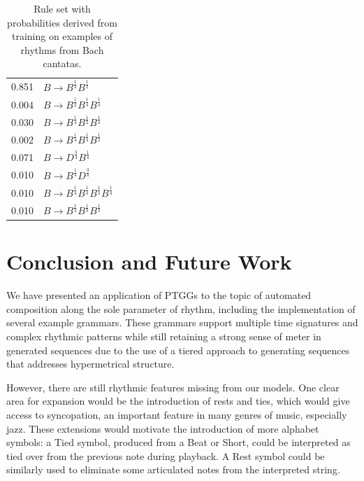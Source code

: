 \documentclass{article}
\begin{document}
\begin{table}
\centering
\begin{tabular}{ll}
0.851 & $B \rightarrow B^\frac{1}{2} B^\frac{1}{2}$\\
0.004 & $B \rightarrow B^\frac{1}{2} B^\frac{1}{4} B^\frac{1}{4}$\\
0.030 & $B \rightarrow B^\frac{1}{4} B^\frac{1}{2} B^\frac{1}{4}$\\ 
0.002 & $B \rightarrow B^\frac{1}{4} B^\frac{1}{4} B^\frac{1}{2}$\\ 
0.071 & $B \rightarrow D^\frac{3}{4} B^\frac{1}{4}$\\
0.010 & $B \rightarrow B^\frac{1}{4} D^\frac{3}{4}$\\
0.010 & $B \rightarrow B^\frac{1}{4} B^\frac{1}{4} B^\frac{1}{4} B^\frac{1}{4}$\\
0.010 & $B \rightarrow B^\frac{1}{3} B^\frac{1}{3} B^\frac{1}{3}$\\ 
\end{tabular}
\caption{Rule set with probabilities derived from training on examples of rhythms from Bach cantatas.}\label{simplerules}
\end{table}



\section{Conclusion and Future Work} 

We have presented an application of PTGGs to the topic of automated composition along the sole parameter of rhythm, including the implementation of several example grammars. These grammars support multiple time signatures and complex rhythmic patterns while still retaining a strong sense of meter in generated sequences due to the use of a tiered approach to generating sequences that addresses hypermetrical structure. 

However, there are still rhythmic features missing from our models. 
One clear area for expansion would be the introduction of rests and ties, which would give access to syncopation, an important feature in many genres of music, especially jazz. These extensions would motivate the introduction of more alphabet symbols: a Tied symbol, produced from a Beat or Short, could be interpreted as tied over from the previous note during playback. A Rest symbol could be similarly used to eliminate some articulated notes from the interpreted string. 
\end{document}

